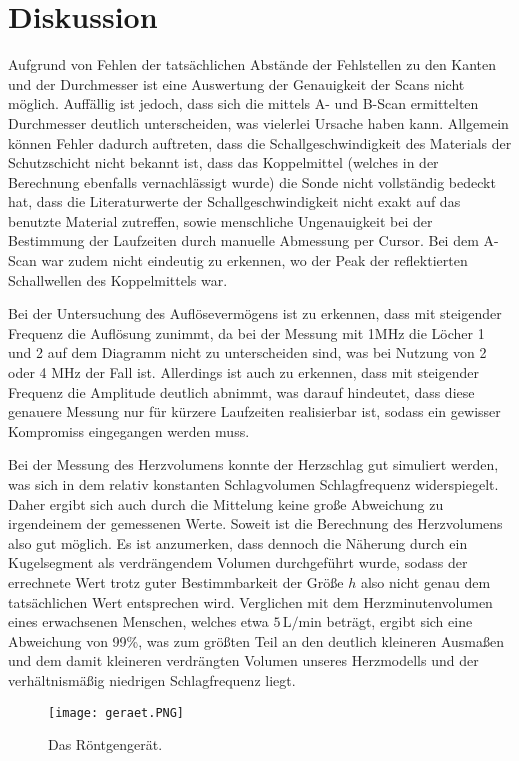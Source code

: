 \section{Diskussion}
\label{sec:Diskussion}

Aufgrund von Fehlen der tatsächlichen Abstände der Fehlstellen zu den Kanten und der Durchmesser
ist eine Auswertung der Genauigkeit der Scans nicht möglich. Auffällig ist jedoch, dass sich
die mittels A- und B-Scan ermittelten Durchmesser deutlich unterscheiden, was vielerlei
Ursache haben kann.
Allgemein können Fehler dadurch auftreten, dass die Schallgeschwindigkeit des
Materials der Schutzschicht nicht bekannt ist, dass das Koppelmittel (welches in der 
Berechnung ebenfalls vernachlässigt wurde) die Sonde nicht vollständig bedeckt hat, dass
die Literaturwerte der Schallgeschwindigkeit nicht exakt auf das benutzte Material zutreffen,
sowie menschliche Ungenauigkeit bei der Bestimmung der Laufzeiten durch manuelle Abmessung 
per Cursor.
Bei dem A-Scan war zudem nicht eindeutig zu erkennen, wo der Peak der reflektierten Schallwellen des Koppelmittels war.

\noindent Bei der Untersuchung des Auflösevermögens ist zu erkennen, dass mit steigender Frequenz die Auflösung zunimmt, da bei
der Messung mit 1MHz die Löcher 1 und 2 auf dem Diagramm nicht zu unterscheiden sind, was bei Nutzung von 2 oder 4
MHz der Fall ist. Allerdings ist auch zu erkennen, dass mit steigender Frequenz die Amplitude deutlich abnimmt, was
darauf hindeutet, dass diese genauere Messung nur für kürzere Laufzeiten realisierbar ist, sodass ein gewisser
Kompromiss eingegangen werden muss.

\noindent Bei der Messung des Herzvolumens konnte der Herzschlag gut simuliert werden, was sich in dem relativ konstanten Schlagvolumen
Schlagfrequenz widerspiegelt. Daher ergibt sich auch durch die Mittelung keine große Abweichung zu irgendeinem der gemessenen Werte. Soweit ist
die Berechnung des Herzvolumens also gut möglich. Es ist anzumerken, dass dennoch die Näherung durch ein Kugelsegment
als verdrängendem Volumen durchgeführt wurde, sodass der errechnete Wert trotz guter Bestimmbarkeit der Größe $h$ also
 nicht genau dem tatsächlichen Wert entsprechen wird. Verglichen mit dem Herzminutenvolumen eines
 erwachsenen Menschen, welches etwa $5\,\si{\liter\per\minute}$ beträgt\cite{kent4}, ergibt sich eine
 Abweichung von 99\%, was zum größten Teil an den deutlich kleineren Ausmaßen und dem damit kleineren verdrängten Volumen
 unseres Herzmodells und der verhältnismäßig niedrigen Schlagfrequenz liegt.

\begin{figure}[H]
  \centering
  \texttt{[image: geraet.PNG]}
  \caption{Das Röntgengerät. \cite[S.4]{kent}}
\end{figure}
 